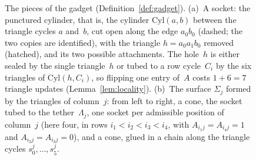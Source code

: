 \begin{figure}[t]
\caption{The pieces of the gadget (Definition~\ref{def:gadget}).
(a)~A socket: the punctured cylinder, that is, the cylinder $\mathrm{Cyl}(a,b)$ between the triangle cycles $a$ and~$b$, cut open along the edge $a_0b_0$ (dashed; the two copies are identified), with the triangle $h=a_0a_1b_0$ removed (hatched), and its two possible attachments.
The hole~$h$ is either sealed by the single triangle~$h$ or tubed to a row cycle~$C_i$ by the six triangles of $\mathrm{Cyl}(h,C_i)$, so flipping one entry of~$A$ costs $1+6=7$ triangle updates (Lemma~\ref{lem:locality}).
(b)~The surface $\Sigma_j$ formed by the triangles of column~$j$: from left to right, a cone, the socket tubed to the tether~$\Lambda_j$, one socket per admissible position of column~$j$ (here four, in rows $i_1<i_2<i_3<i_4$, with $A_{i_1j}=A_{i_4j}=1$ and $A_{i_2j}=A_{i_3j}=0$), and a cone, glued in a chain along the triangle cycles $s^j_0,\dots,s^j_5$.}
\label{fig:socket}
\end{figure}
